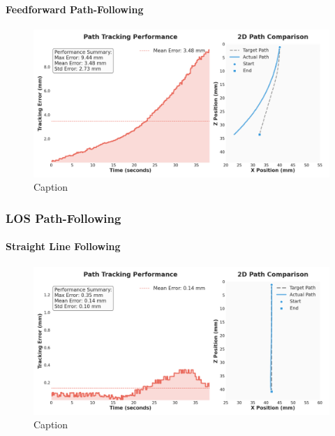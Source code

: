 \paragraph*{Feedforward Path-Following}
\begin{figure} [H]
    \centering
    \includegraphics[width=\linewidth]{images/pathfollowing/openloop/longleft_250703_120246.png}
    \caption{Caption}
    \label{fig:enter-label}
\end{figure}



\subsubsection{LOS Path-Following}

\paragraph*{Straight Line Following}
\begin{figure} [H]
    \centering
    \includegraphics[width=\linewidth]{images/pathfollowing/LOS/straight_250704_164825.png}
    \caption{Caption}
    \label{fig:enter-label}
\end{figure}

